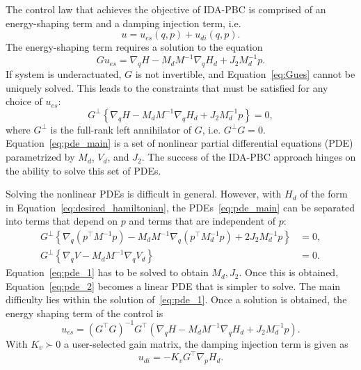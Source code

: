 The control law that achieves the objective of IDA-PBC is comprised of an energy-shaping term
and a damping injection term, i.e.
%
\begin{equation}
    u = u_{es}(q,p) + u_{di}(q,p)
    \label{eq:ida-pbc_control}.
\end{equation}
%
The energy-shaping term requires a solution to the equation
%
\begin{equation}
    Gu_{es} = \nabla_qH - M_dM^{-1} \nabla_qH_d + J_2M_d^{-1}p.
    \label{eq:Gues}
\end{equation}
%
If system is underactuated, $G$ is not invertible, and Equation~\eqref{eq:Gues}
cannot be uniquely solved. This leads to the constraints that must be
satisfied for any choice of $u_{es}$:
%
\begin{equation}
  G^\perp \left\{ \nabla_qH - M_dM^{-1} \nabla_qH_d + J_2M_d^{-1}p \right\} = 0,
  \label{eq:pde_main}
\end{equation}
%
where $G^\perp$ is the full-rank left annihilator of $G$, i.e. $G^\perp G = 0$.
Equation~\eqref{eq:pde_main} is a set of nonlinear partial differential
equations (PDE) parametrized by $M_d$, $V_d$, and $J_2$. The success of the
IDA-PBC approach hinges on the ability to solve this set of PDEs.


Solving the nonlinear PDEs is difficult in general. However, with $H_d$ of the
form in Equation~\eqref{eq:desired_hamiltonian}, the PDEs~\eqref{eq:pde_main}
can be separated into terms that depend on $p$ and terms that are independent of
$p$:
%
\begin{align}
  \label{eq:pde_1}
  G^\perp \left\{ \nabla_q\left(p^\top M^{-1} p\right) - M_dM^{-1} \nabla_q\left(p^\top M_d^{-1} p\right) + 2J_2M_d^{-1}p \right\} &= 0, \\
  \label{eq:pde_2}
  G^\perp \left\{ \nabla_qV - M_dM^{-1} \nabla_qV_d \right\} &= 0.
\end{align}
%
Equation~\eqref{eq:pde_1} has to be solved to obtain $M_d, J_2$. Once this is
obtained, Equation~\eqref{eq:pde_2} becomes a linear PDE that is simpler to
solve. The main difficulty lies within the solution of~\eqref{eq:pde_1}.
%
Once a solution is obtained, the energy shaping term of the control is
%
\begin{equation}
  u_{es} = \left(G^\top G\right)^{-1} G^\top \left(\nabla_qH - M_dM^{-1} \nabla_qH_d + J_2M_d^{-1}p\right).
  \label{eq:ues}
\end{equation}
%
With $K_v \succ 0$ a user-selected gain matrix, the damping injection term is given as
%
\begin{equation}
    u_{di} = -K_v G^\top \nabla_p H_d.
    \label{eq:udi}
\end{equation}
%


